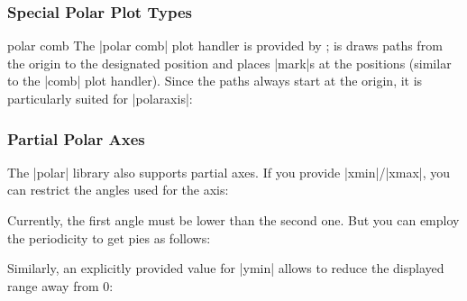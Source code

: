 {\subsubsection{Special Polar Plot Types}
\begin{plottype}{polar comb}
	The |polar comb| plot handler is provided by \Tikz; is draws paths from the origin to the designated position and places |mark|s at the positions (similar to the |comb| plot handler). Since the paths always start at the origin, it is particularly suited for |polaraxis|:
\begin{codeexample}[]
\end{codeexample}
\end{plottype}

\subsubsection{Partial Polar Axes}
The |polar| library also supports partial axes. If you provide |xmin|/|xmax|, you can restrict the angles used for the axis:
\begin{codeexample}[]
\end{codeexample}

Currently, the first angle must be lower than the second one. But you can employ the periodicity to get pies as follows:
\begin{codeexample}[]
\end{codeexample}
\noindent Similarly, an explicitly provided value for |ymin| allows to reduce the displayed range away from $0$:
\begin{codeexample}[]
\end{codeexample}

}
